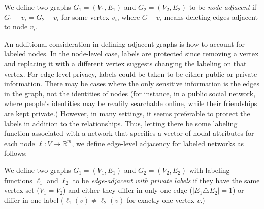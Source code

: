 \begin{definition}
\label{def:node_level}
We define two graphs $G_1 = (V_1, E_1)$ and $G_2 = (V_2, E_2)$ to be \emph{node-adjacent} if $G_1-v_i = G_2-v_i$ for some vertex $v_i$, where $G-v_i$ means deleting edges adjacent to node $v_i$.
\end{definition}

An additional consideration in defining adjacent graphs is how to account for labeled nodes. In the node-level case, labels are protected since removing a vertex and replacing it with a different vertex suggests changing the labeling on that vertex. For edge-level privacy, labels could be taken to be either public or private information.  There may be cases where the only sensitive information is the edges in the graph, not the identities of nodes (for instance, in a public social network, where people's identities may be readily searchable online, while their friendships are kept private.) However, in many settings, it seems preferable to protect the labels in addition to the relationships. Thus, letting there be some labeling function associated with a network that specifies a vector of nodal attributes for each node $\ell: V \to \mathbb{R}^m$, we define edge-level adjacency for labeled networks as follows:

\begin{definition}
	\label{def:edge_level}
	We define two graphs $G_1 = (V_1, E_1)$ and $G_2 = (V_2, E_2)$ with labeling functions $\ell_1$ and $\ell_2$ to be \emph{edge-adjacent with private labels} if they have the same vertex set ($V_1 = V_2$) and either they  differ in only one edge ($\left| E_1 \triangle E_2   \right| = 1$) or differ in one label ($\ell_1(v) \not = \ell_2(v)$ for exactly one vertex $v$.)
\end{definition}



